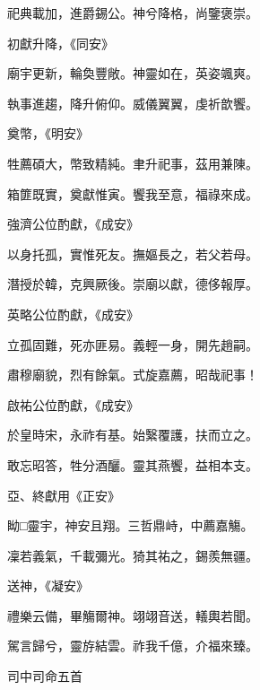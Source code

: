 \begin{pinyinscope}
 祀典載加，進爵錫公。神兮降格，尚鑒褒崇。



 初獻升降，《同安》



 廟宇更新，輪奐豐敞。神靈如在，英姿颯爽。



 執事進趨，降升俯仰。威儀翼翼，虔祈歆饗。



 奠幣，《明安》



 牲薦碩大，幣致精純。聿升祀事，茲用兼陳。



 箱篚既實，奠獻惟寅。饗我至意，福祿來成。



 強濟公位酌獻，《成安》



 以身托孤，實惟死友。撫嫗長之，若父若母。



 潛授於韓，克興厥後。崇廟以獻，德侈報厚。



 英略公位酌獻，《成安》



 立孤固難，死亦匪易。義輕一身，開先趙嗣。



 肅穆廟貌，烈有餘氣。式旋嘉薦，昭哉祀事！



 啟祐公位酌獻，《成安》



 於皇時宋，永祚有基。始繄覆護，扶而立之。



 敢忘昭答，牲分酒釃。靈其燕饗，益相本支。



 亞、終獻用《正安》



 眑□靈宇，神安且翔。三哲鼎峙，中薦嘉觴。



 凜若義氣，千載彌光。猗其祐之，錫羨無疆。



 送神，《凝安》



 禮樂云備，畢觴爾神。翊翊音送，轙輿若聞。



 駕言歸兮，靈斿結雲。祚我千億，介福來臻。



 司中司命五首




\end{pinyinscope}
